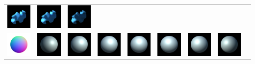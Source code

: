 \begin{center}
\begin{longtable}{@{}c@{}c@{}c@{}c@{}c@{}c@{}c@{}c@{}c@{}}
\includegraphics[width=0.1\linewidth]{training/41_5.png} & \includegraphics[width=0.1\linewidth]{training/41_6.png} &
\includegraphics[width=0.1\linewidth]{training/41_7.png} \\
\includegraphics[width=0.1\linewidth]{training/42_gt.png} & \includegraphics[width=0.1\linewidth]{training/42_0.png} &
\includegraphics[width=0.1\linewidth]{training/42_1.png} & \includegraphics[width=0.1\linewidth]{training/42_2.png} &
\includegraphics[width=0.1\linewidth]{training/42_3.png} & \includegraphics[width=0.1\linewidth]{training/42_4.png} &
\includegraphics[width=0.1\linewidth]{training/42_5.png} & \includegraphics[width=0.1\linewidth]{training/42_6.png} &

\end{longtable}
\end{center}

